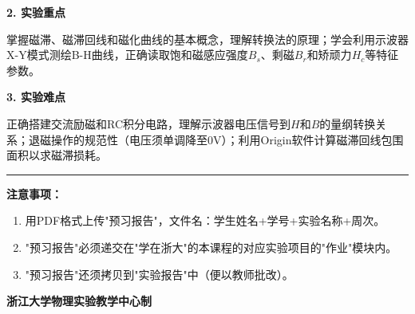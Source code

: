 \documentclass[a4paper,12pt]{article}
\begin{document}
\vspace{0.5cm}

{\fontsize{14pt}{20pt}\selectfont \textbf{2. 实验重点}}

\vspace{0.3cm}

{\fontsize{12pt}{18pt}\selectfont

掌握磁滞、磁滞回线和磁化曲线的基本概念，理解转换法的原理；学会利用示波器X-Y模式测绘B-H曲线，正确读取饱和磁感应强度$B_s$、剩磁$B_r$和矫顽力$H_c$等特征参数。

}

\vspace{0.5cm}

{\fontsize{14pt}{20pt}\selectfont \textbf{3. 实验难点}}

\vspace{0.3cm}

{\fontsize{12pt}{18pt}\selectfont

正确搭建交流励磁和RC积分电路，理解示波器电压信号到$H$和$B$的量纲转换关系；退磁操作的规范性（电压须单调降至0V）；利用Origin软件计算磁滞回线包围面积以求磁滞损耗。

}

\vfill

\noindent\rule{\textwidth}{0.4pt}

{\fontsize{12pt}{18pt}\selectfont
\textbf{注意事项：}
\begin{enumerate}[label=\arabic*., leftmargin=2em, nosep]
    \item 用PDF格式上传"预习报告"，文件名：学生姓名+学号+实验名称+周次。
    \item "预习报告"必须递交在"学在浙大"的本课程的对应实验项目的"作业"模块内。
    \item "预习报告"还须拷贝到"实验报告"中（便以教师批改）。
\end{enumerate}
}

\vspace{0.5cm}
\begin{center}
    {\fontsize{12pt}{18pt}\selectfont \textbf{浙江大学物理实验教学中心制}}
\end{center}
\end{document}
